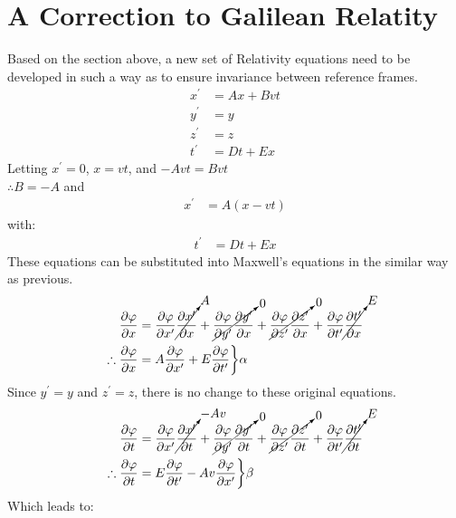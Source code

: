 \documentclass[letterpaper]{article}
\begin{document}
\section{A Correction to Galilean Relatity}
Based on the section above, a new set of Relativity equations need to
be developed in such a way as to ensure invariance between reference
frames.
\begin{align*}
x^\prime &= Ax + Bvt\\
y^\prime &= y\\
z^\prime &= z\\
t^\prime &= Dt + Ex
\end{align*}
Letting $x^\prime = 0$, $x = vt$, and $-Avt = Bvt$\\
$\therefore B = -A$ and
\begin{align*}
x^\prime &= A(x - vt)
\end{align*}
with:
\begin{align*}
t^\prime &= Dt + Ex
\end{align*}
These equations can be substituted into Maxwell's equations in the
similar way as previous.
\begin{align*}
\frac{\partial\varphi}{\partial x} &=
\frac{\partial\varphi}{\partial x^\prime}\cancelto{A}{\frac{\partial x^\prime}{\partial x}}
+\cancelto{0}{\frac{\partial\varphi}{\partial y^\prime}\frac{\partial y^\prime}{\partial x}}
+\cancelto{0}{\frac{\partial\varphi}{\partial z^\prime}\frac{\partial z^\prime}{\partial x}}
+\frac{\partial\varphi}{\partial t^\prime}\cancelto{E}{\frac{\partial t^\prime}{\partial x}}
\\\therefore
\frac{\partial\varphi}{\partial x} &= A\frac{\partial\varphi}{\partial x^\prime} +
E\frac{\partial\varphi}{\partial t^\prime}\bigg\}\alpha
\end{align*}
Since $y^\prime = y$ and $z^\prime = z$, there is no change to these
original equations.
\begin{align*}
\frac{\partial\varphi}{\partial t} &=
\frac{\partial\varphi}{\partial x^\prime}\cancelto{-Av}{\frac{\partial x^\prime}{\partial t}}
+\cancelto{0}{\frac{\partial\varphi}{\partial y^\prime}\frac{\partial y^\prime}{\partial t}}
+\cancelto{0}{\frac{\partial\varphi}{\partial z^\prime}\frac{\partial z^\prime}{\partial t}}
+\frac{\partial\varphi}{\partial t^\prime}\cancelto{E}{\frac{\partial t^\prime}{\partial t}}
\\\therefore
\frac{\partial\varphi}{\partial t} &=
E\frac{\partial\varphi}{\partial t^\prime} -
Av\frac{\partial\varphi}{\partial x^\prime}\bigg\}\beta
\end{align*}
Which leads to:
\end{document}
